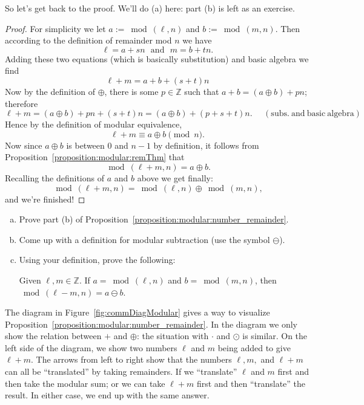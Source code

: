 \noindent
So let's get back to the proof.  We'll do (a) here: part (b) is left as an exercise.

\begin{proof}
For simplicity we let $a :=  \bmod(\ell,n)$ and $b :=  \bmod(m,n)$. Then according to the definition of remainder mod $n$ we have
\[ \ell = a + sn \mathrm{~~~and~~~} m = b + tn. \]
Adding these two equations (which is basically substitution) and basic algebra we find
\[ \ell + m =a + b + (s + t)n \]
Now by the definition of $\oplus$, there is some $p \in {\mathbb Z}$ such that  $a + b = (a \oplus b) + pn$; therefore 
\[ \ell + m = (a \oplus b) + pn + (s + t)n = (a \oplus b) + ( p + s + t)n. \mathrm{~~~~~~(subs.~and~ basic~algebra)} \]
Hence by the definition of modular equivalence, 
\[ \ell + m \equiv a \oplus b \pmod{n}. \]
Now since $a \oplus b$ is between $0$ and $n-1$ by definition, it follows from Proposition~\ref{proposition:modular:remThm} that
\[ \bmod(\ell + m,n)= a \oplus b. \]
Recalling the definitions of $a$ and $b$ above we get finally:
\[ \bmod(\ell + m,n)=  \bmod(\ell,n) \oplus \bmod(m,n), \]
and we're finished!
\end{proof}

\begin{exercise}{44}
\begin{enumerate}[(a)]
\item
Prove part (b) of Proposition~\ref{proposition:modular:number_remainder}.
\item
Come up with a definition for modular subtraction (use the symbol $\ominus$).
\item
Using your definition, prove the following:

\noindent
Given $\ell,m \in {\mathbb Z}$. If $a =\bmod(\ell,n)$ and $b=\bmod(m,n)$, then  $\bmod(\ell - m,n) = a\ominus b $.
\end{enumerate}
\end{exercise}

The diagram in Figure~\ref{fig:commDiagModular} gives a way to visualize  Proposition~\ref{proposition:modular:number_remainder}.  In the diagram we only show the relation between $+$ and $\oplus$: the situation with $\cdot$ and $\odot$ is similar. On the left side of the diagram, we show two numbers $\ell$ and $m$ being added to give $\ell + m$. The arrows from left to right show that the numbers $\ell, m,$ and $\ell + m$ can all be ``translated'' by taking remainders. If we ``translate'' $\ell$ and $m$ first and then take the modular sum; or we can take $\ell + m$ first and then ``translate'' the result. In either case, we end up with the same answer.

